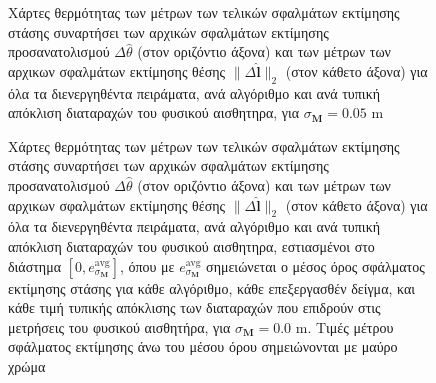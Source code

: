 \begin{figure}[!h]\vspace{1cm}\hspace{0.5cm}
  
  \vspace{1cm}
  \caption{\small Χάρτες θερμότητας των μέτρων των τελικών σφαλμάτων εκτίμησης
           στάσης συναρτήσει των αρχικών σφαλμάτων εκτίμησης προσανατολισμού
           $\Delta\hat{\theta}$ (στον οριζόντιο άξονα) και των μέτρων των
           αρχικων σφαλμάτων εκτίμησης θέσης $\|\Delta \hat{\bm{l}}\|_2$ (στον
           κάθετο άξονα) για όλα τα διενεργηθέντα πειράματα, ανά αλγόριθμο και
           ανά τυπική απόκλιση διαταραχών του φυσικού αισθητηρα, για
           $\sigma_{\bm{M}} = 0.05$ m}
  \label{fig:02_04_05:07}
\end{figure}

\begin{figure}[!h]\vspace{1cm}\hspace{0.5cm}
  
  \vspace{1cm}
  \caption{\small Χάρτες θερμότητας των μέτρων των τελικών σφαλμάτων εκτίμησης
           στάσης συναρτήσει των αρχικών σφαλμάτων εκτίμησης προσανατολισμού
           $\Delta\hat{\theta}$ (στον οριζόντιο άξονα) και των μέτρων των
           αρχικων σφαλμάτων εκτίμησης θέσης $\|\Delta \hat{\bm{l}}\|_2$ (στον
           κάθετο άξονα) για όλα τα διενεργηθέντα πειράματα, ανά αλγόριθμο και
           ανά τυπική απόκλιση διαταραχών του φυσικού αισθητηρα, εστιασμένοι
           στο διάστημα $[0, e_{\sigma_{\bm{M}}}^{\text{avg}}]$, όπου με
           $e_{\sigma_{\bm{M}}}^{\text{avg}}$ σημειώνεται ο μέσος όρος
           σφάλματος εκτίμησης στάσης για κάθε αλγόριθμο, κάθε επεξεργασθέν
           δείγμα, και κάθε τιμή τυπικής απόκλισης των διαταραχών που επιδρούν
           στις μετρήσεις του φυσικού αισθητήρα, για $\sigma_{\bm{M}} = 0.0$ m.
           Τιμές μέτρου σφάλματος εκτίμησης άνω του μέσου όρου σημειώνονται με
           μαύρο χρώμα}
  \label{fig:02_04_05:08}
\end{figure}

